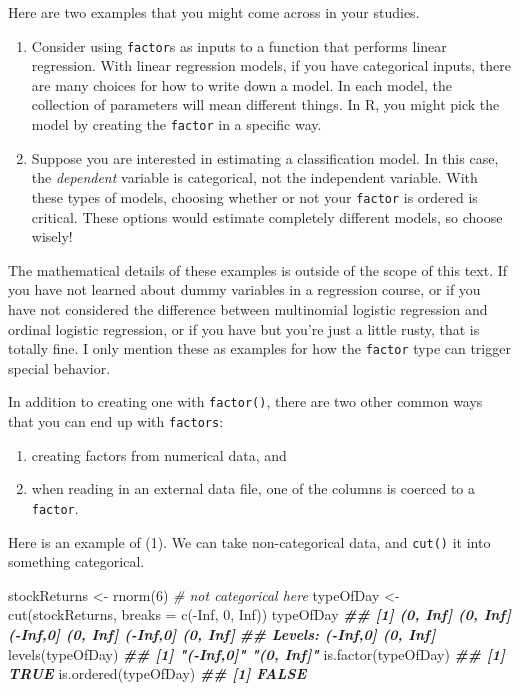 \documentclass[
  12pt,
  krantz2]{krantz}
\makeatletter
\newenvironment{Shaded}{\begin{snugshade}}{\end{snugshade}}
\newcommand{\AttributeTok}[1]{\textcolor[rgb]{0.61,0.61,0.61}{#1}}
\newcommand{\CommentTok}[1]{\textcolor[rgb]{0.37,0.37,0.37}{\textit{#1}}}
\newcommand{\ConstantTok}[1]{\textcolor[rgb]{0,0,0}{#1}}
\newcommand{\DecValTok}[1]{\textcolor[rgb]{0.06,0.06,0.06}{#1}}
\newcommand{\DocumentationTok}[1]{\textcolor[rgb]{0.37,0.37,0.37}{\textbf{\textit{#1}}}}
\newcommand{\FunctionTok}[1]{\textcolor[rgb]{0,0,0}{#1}}
\newcommand{\NormalTok}[1]{#1}
\newcommand{\OtherTok}[1]{\textcolor[rgb]{0.37,0.37,0.37}{#1}}
\newcommand{\SpecialCharTok}[1]{\textcolor[rgb]{0,0,0}{#1}}
\providecommand{\tightlist}{%
  \setlength{\itemsep}{0pt}\setlength{\parskip}{0pt}}
\newenvironment{kframe}{%
\medskip{}
\setlength{\fboxsep}{.8em}
 \def\at@end@of@kframe{}%
 \ifinner\ifhmode%
  \def\at@end@of@kframe{\end{minipage}}%
  \begin{minipage}{\columnwidth}%
 \fi\fi%
 \def\FrameCommand##1{\hskip\@totalleftmargin \hskip-\fboxsep
 \colorbox{shadecolor}{##1}\hskip-\fboxsep
     \hskip-\linewidth \hskip-\@totalleftmargin \hskip\columnwidth}%
 \MakeFramed {\advance\hsize-\width
   \@totalleftmargin\z@ \linewidth\hsize
   \@setminipage}}%
 {\par\unskip\endMakeFramed%
 \at@end@of@kframe}
\renewenvironment{Shaded}{\begin{kframe}}{\end{kframe}}
\makeatother
\begin{document}
Here are two examples that you might come across in your studies.

\begin{enumerate}
\def\labelenumi{\arabic{enumi}.}
\item
  Consider using \texttt{factor}s as inputs to a function that performs linear regression. With linear regression models, if you have categorical inputs, there are many choices for how to write down a model. In each model, the collection of parameters will mean different things. In R, you might pick the model by creating the \texttt{factor} in a specific way.
\item
  Suppose you are interested in estimating a classification model. In this case, the \emph{dependent} variable is categorical, not the independent variable. With these types of models, choosing whether or not your \texttt{factor} is ordered is critical. These options would estimate completely different models, so choose wisely!
\end{enumerate}

The mathematical details of these examples is outside of the scope of this text. If you have not learned about dummy variables in a regression course, or if you have not considered the difference between multinomial logistic regression and ordinal logistic regression, or if you have but you're just a little rusty, that is totally fine. I only mention these as examples for how the \texttt{factor} type can trigger special behavior.

In addition to creating one with \texttt{factor()}, there are two other common ways that you can end up with \texttt{factors}:

\begin{enumerate}
\def\labelenumi{\arabic{enumi}.}
\tightlist
\item
  creating factors from numerical data, and
\item
  when reading in an external data file, one of the columns is coerced to a \texttt{factor}.
\end{enumerate}

Here is an example of (1). We can take non-categorical data, and \texttt{cut()} it into something categorical.

\begin{Shaded}
\begin{Highlighting}[]
\NormalTok{stockReturns }\OtherTok{\textless{}{-}} \FunctionTok{rnorm}\NormalTok{(}\DecValTok{6}\NormalTok{) }\CommentTok{\# not categorical here}
\NormalTok{typeOfDay }\OtherTok{\textless{}{-}} \FunctionTok{cut}\NormalTok{(stockReturns, }\AttributeTok{breaks =} \FunctionTok{c}\NormalTok{(}\SpecialCharTok{{-}}\ConstantTok{Inf}\NormalTok{, }\DecValTok{0}\NormalTok{, }\ConstantTok{Inf}\NormalTok{)) }
\NormalTok{typeOfDay}
\DocumentationTok{\#\# [1] (0, Inf] (0, Inf] ({-}Inf,0] (0, Inf] ({-}Inf,0] (0, Inf]}
\DocumentationTok{\#\# Levels: ({-}Inf,0] (0, Inf]}
\FunctionTok{levels}\NormalTok{(typeOfDay)}
\DocumentationTok{\#\# [1] "({-}Inf,0]" "(0, Inf]"}
\FunctionTok{is.factor}\NormalTok{(typeOfDay)}
\DocumentationTok{\#\# [1] TRUE}
\FunctionTok{is.ordered}\NormalTok{(typeOfDay)}
\DocumentationTok{\#\# [1] FALSE}
\end{Highlighting}
\end{Shaded}
\end{document}
